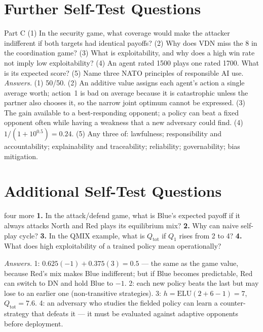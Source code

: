 \documentclass[11pt]{article}
\begin{document}
\section{Further Self-Test Questions}
\begin{question}{Part C}
(1) In the security game, what coverage would make the attacker indifferent if both targets had identical payoffs? (2) Why does VDN miss the 8 in the coordination game? (3) What is exploitability, and why does a high win rate not imply low exploitability? (4) An agent rated 1500 plays one rated 1700. What is its expected score? (5) Name three NATO principles of responsible AI use.\\
\textit{Answers.} (1) 50/50. (2) An additive value assigns each agent's action a single average worth; action~1 is bad on average because it is catastrophic unless the partner also chooses it, so the narrow joint optimum cannot be expressed. (3) The gain available to a best-responding opponent; a policy can beat a fixed opponent often while having a weakness that a new adversary could find. (4) $1/(1+10^{0.5})=0.24$. (5) Any three of: lawfulness; responsibility and accountability; explainability and traceability; reliability; governability; bias mitigation.
\end{question}

\section{Additional Self-Test Questions}
\begin{question}{four more}
\textbf{1.} In the attack/defend game, what is Blue's expected payoff if it always attacks North and Red plays its equilibrium mix? \textbf{2.} Why can naive self-play cycle? \textbf{3.} In the QMIX example, what is $Q_{\text{tot}}$ if $Q_1$ rises from 2 to 4? \textbf{4.} What does high exploitability of a trained policy mean operationally?

\textit{Answers.} 1: $0.625(-1)+0.375(3)=0.5$ --- the same as the game value, because Red's mix makes Blue indifferent; but if Blue becomes predictable, Red can switch to DN and hold Blue to $-1$. 2: each new policy beats the last but may lose to an earlier one (non-transitive strategies). 3: $h=\text{ELU}(2+6-1)=7$, $Q_{\text{tot}}=7.6$. 4: an adversary who studies the fielded policy can learn a counter-strategy that defeats it --- it must be evaluated against adaptive opponents before deployment.
\end{question}
\end{document}
